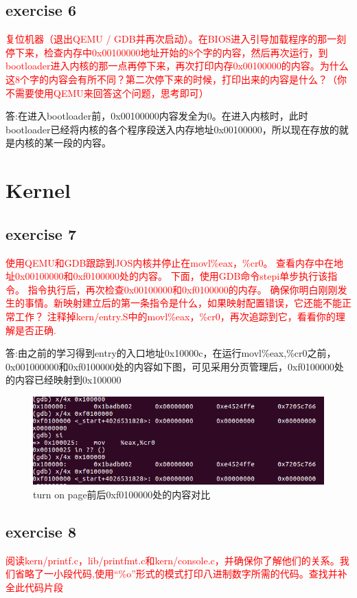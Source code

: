 \documentclass[]{ctexrep}
\begin{document}
\section{exercise 6}
\textcolor{red}{复位机器（退出QEMU / GDB并再次启动）。在BIOS进入引导加载程序的那一刻停下来，检查内存中0x00100000地址开始的8个字的内容，然后再次运行，到bootloader进入内核的那一点再停下来，再次打印内存0x00100000的内容。为什么这8个字的内容会有所不同？第二次停下来的时候，打印出来的内容是什么？（你不需要使用QEMU来回答这个问题，思考即可）}

答:在进入bootloader前，0x00100000内容发全为0。在进入内核时，此时bootloader已经将内核的各个程序段送入内存地址0x00100000，所以现在存放的就是内核的某一段的内容。

\chapter{Kernel}
\section{exercise 7}
\textcolor{red}{使用QEMU和GDB跟踪到JOS内核并停止在movl\%eax，\%cr0。 查看内存中在地址0x00100000和0xf0100000处的内容。 下面，使用GDB命令stepi单步执行该指令。 指令执行后，再次检查0x00100000和0xf0100000的内存。 确保你明白刚刚发生的事情。新映射建立后的第一条指令是什么，如果映射配置错误，它还能不能正常工作？ 注释掉kern/entry.S中的movl\%eax，\%cr0，再次追踪到它，看看你的理解是否正确.}

答:由之前的学习得到entry的入口地址0x10000c，在运行movl\%eax,\%cr0之前，0x001000000和0xf0100000处的内容如下图，可见采用分页管理后，0xf0100000处的内容已经映射到0x100000

\begin{figure}[htbp!]
	\centering\includegraphics[scale=0.7]{figure/cr0}
	\caption{turn on page前后0xf0100000处的内容对比}
\end{figure}

\section{exercise 8}
	\textcolor{red}{阅读kern/printf.c，lib/printfmt.c和kern/console.c，并确保你了解他们的关系。我们省略了一小段代码,使用“\%o”形式的模式打印八进制数字所需的代码。查找并补全此代码片段}
	
\end{document}

